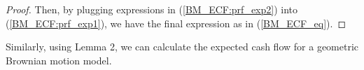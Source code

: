 \documentclass[11pt]{article}
\theoremstyle{plain}
\numberwithin{equation}{section}
\newtheorem{lem}[thm]{Lemma}
\begin{document}
{{{\begin{proof}
%
Then, by plugging expressions in (\ref{BM_ECF:prf_exp2}) into (\ref{BM_ECF:prf_exp1}), we have the final expression as in (\ref{BM_ECF_eq}). 


	
	
\end{proof}
}


Similarly, using Lemma 2, we can calculate the expected cash flow for a geometric Brownian motion model. 

%
%
% 
%
% 
%
%
%
%
}}
\end{document}
